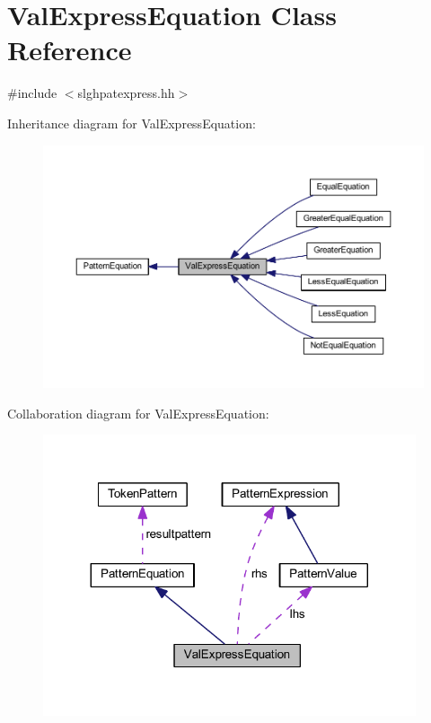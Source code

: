 \hypertarget{class_val_express_equation}{}\section{Val\+Express\+Equation Class Reference}
\label{class_val_express_equation}


{\ttfamily \#include $<$slghpatexpress.\+hh$>$}



Inheritance diagram for Val\+Express\+Equation\+:
\nopagebreak
\begin{figure}[H]
\begin{center}
\leavevmode
\includegraphics[width=350pt]{class_val_express_equation__inherit__graph}
\end{center}
\end{figure}


Collaboration diagram for Val\+Express\+Equation\+:
\nopagebreak
\begin{figure}[H]
\begin{center}
\leavevmode
\includegraphics[width=311pt]{class_val_express_equation__coll__graph}
\end{center}
\end{figure}
